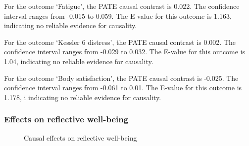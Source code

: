 \documentclass[
  singlecolumn,
  9pt]{article}
\begin{document}
For the outcome `Fatigue', the PATE causal contrast is 0.022. The
confidence interval ranges from -0.015 to 0.059. The E-value for this
outcome is 1.163, indicating no reliable evidence for causality.

For the outcome `Kessler 6 distress', the PATE causal contrast is 0.002.
The confidence interval ranges from -0.029 to 0.032. The E-value for
this outcome is 1.04, indicating no reliable evidence for causality.

For the outcome `Body satisfaction', the PATE causal contrast is -0.025.
The confidence interval ranges from -0.061 to 0.01. The E-value for this
outcome is 1.178, i indicating no reliable evidence for causality.

\newpage{}

\subsubsection{Effects on reflective
well-being}\label{effects-on-reflective-well-being}

\begin{figure}


\caption{\label{fig-results-reflective-well-being-cats}Causal effects on
reflective well-being}

\end{figure}%

\newpage{}
\end{document}
